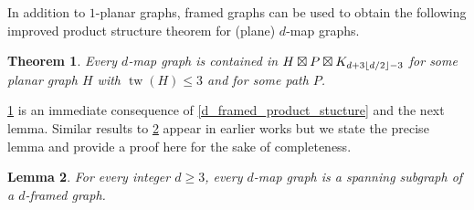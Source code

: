 \documentclass{patmorin}
\theoremstyle{plain}
\newtheorem{thm}{Theorem}
\newtheorem{lem}[thm]{Lemma}
\theoremstyle{definition}
\newcommand{\defin}[1]{\textcolor{Maroon}{\emph{#1}}}
\newcommand{\note}[2]{\noindent{\color{red}[#1:~#2]}}
\DeclareMathOperator{\tw}{tw}
\DeclarePairedDelimiter{\floor}{\lfloor}{\rfloor}
\renewcommand{\geq}{\geqslant}
\renewcommand{\leq}{\leqslant}
\begin{document}
%

In addition to $1$-planar graphs, framed graphs can be used to obtain the following improved product structure theorem for (plane) $d$-map graphs.

\begin{thm}
\label{dMapProduct}
Every $d$-map graph is contained in $H \boxtimes P \boxtimes K_{ d + 3\floor{d/2} -3 }$ for some planar graph $H$ with $\tw(H) \leq 3$ and for some path $P$.
\end{thm}

\cref{dMapProduct} is an immediate consequence of \cref{d_framed_product_stucture} and the next lemma. Similar results to \cref{MewMapGraphLemma} appear in earlier works \cite{CGP06,BDGGMR,Brandenburg19,Brandenburg20} but we state the precise lemma and provide a proof here for the sake of completeness.



\begin{lem}
\label{MewMapGraphLemma}
For every %
integer %
 $d\geq 3$, every $d$-map graph is a spanning subgraph of a $d$-framed graph.
\end{lem}
\end{document}
